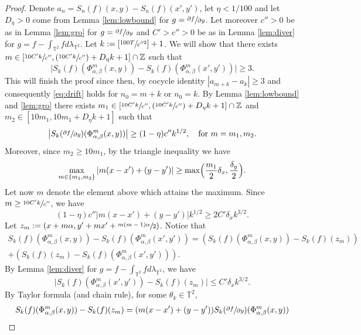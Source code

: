\documentclass[JEP,XML,SOM,Unicode,NoEqCountersInSection]{cedram}
\newcommand{\Psfrac}[2]{(\sfrac{#1}{#2})}
\theoremstyle{definition}
\theoremstyle{plain}
\newcommand\TT{\mathbb{T}}
\newcommand\ZZ{\mathbb{Z}}
\begin{document}
\begin{proof} Denote $a_n=S_{n}(f)(x,y)-S_{n}(f)(x',y')$, let $\eta<1/100$ and let $D_\eta>0$ come from Lemma \ref{lem:lowbound} for $g=\sfrac{\partial f}{\partial y}$. Let moreover $c''>0$ be as in Lemma \ref{lem:gro} for $g=\sfrac{\partial f}{\partial y}$ and $C'>c'' >0$ be as in Lemma \ref{lem:diver} for $g=f-\int_{\TT^2} f d\lambda_{\TT^2}$.
Let $k:=[\sfrac{100T}{c''^2}]+1$. We will show that there exists $m\in [\sfrac{10C'k}{c''},\Psfrac{10C'k}{c''}+D_\eta k+1]\cap \ZZ$ such that
\begin{equation}\label{eq:cocyid}
\bigl|S_k(f)(\Phi_{\alpha,\beta}^m(x,y))-S_k(f)(\Phi_{\alpha,\beta}^m(x',y'))\bigr|\geq 3.
\end{equation}
This will finish the proof since then, by cocycle identity $|a_{m+k}-a_k|\geq 3$ and consequently \eqref{eq:drift} holds for $n_0=m+k$ or $n_0=k$.
By Lemma \ref{lem:lowbound} and \ref{lem:gro} there exists $m_1\in [\sfrac{10C'k}{c''},\Psfrac{10C'k}{c''}+D_\eta k+1]\cap \ZZ$ and $m_2\in [10m_1,10m_1+D_\eta k+1]$ such
that
\begin{equation}\label{eq:mlarge}
\bigl|S_k(\sfrac{\partial f}{\partial y})(\Phi_{\alpha,\beta}^m(x,y))\bigr|\geq (1-\eta)c'' k^{1/2}, \quad \text {for } m=m_1, m_2.
\end{equation}
Moreover, since $m_2\geq 10m_1$, by the triangle inequality we have
\[
\max_{m\in\{m_1,m_2\}}\vert m(x-x')+(y-y')\vert \geq \max\Bigl(\frac{m_1}{2}\delta_x,\frac{\delta_y}{2}\Bigr).
\]
Let now $m$ denote the element above which attains the maximum. Since
$m\geq \sfrac{10C'k}{c''}$, we have
\begin{equation}\label{eq:qu}
(1-\eta)c''\bigl\vert m(x-x')+(y-y')\bigr\vert k^{1/2}\geq 2C'\delta_x k^{3/2}.
\end{equation}
Let $z_m:=( x+m\alpha, y'+m x'+\sfrac{m(m-1)\alpha}{2})$. Notice that
\begin{multline}\label{mult:split}
S_k(f)(\Phi_{\alpha,\beta}^m(x,y))-S_k(f)(\Phi_{\alpha,\beta}^m(x',y'))=
\left(S_k(f)(\Phi_{\alpha,\beta}^m(x,y))-S_k(f)(z_m)\right)\\
+\left(S_k(f)(z_m)-S_k(f)(\Phi_{\alpha,\beta}^m(x',y'))\right).
\end{multline}
By Lemma \ref{lem:diver} for $g=f-\int_{\TT^2} f d\lambda_{\TT^2}$, we have
\[
\bigl|S_k(f)(\Phi_{\alpha,\beta}^m(x',y'))-S_k(f)(z_m)\bigr|\leq C' \delta_x k^{3/2}.
\]
By Taylor formula (and chain rule), for some $\theta_k\in \TT^2$,
\begin{multline*}
S_k(f)(\Phi_{\alpha,\beta}^m(x,y))-S_k(f)(z_m)=(m(x-x')+(y-y'))S_k(\sfrac{\partial f}{\partial y})(\Phi_{\alpha,\beta}^m(x,y))\\

\end{multline*}
\end{proof}
\end{document}
